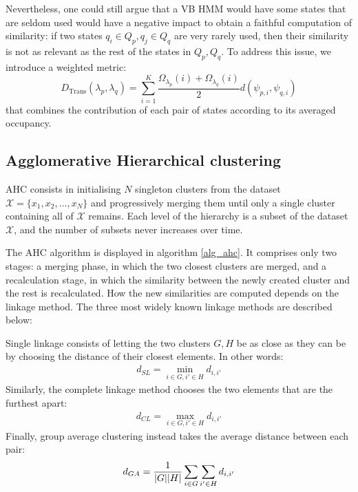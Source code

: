 \documentclass[pdftex,11pt,a4paper]{article}
\theoremstyle{definition}
\theoremstyle{remark}
\DeclarePairedDelimiter\abs{\lvert}{\rvert}%
\begin{document}
\par Nevertheless, one could still argue that a VB HMM would have some states that are seldom used would have a negative impact to obtain a faithful computation of similarity: if two states $q_i \in Q_p, q_j \in Q_q$ are very rarely used, then their similarity is not as relevant as the rest of the states in $Q_p, Q_q$. To address this issue, we introduce a weighted metric:
\begin{equation} \label{eq:hmmdist}
D_{\text{Trans}}(\lambda_p, \lambda_q) = \sum_{i=1}^K \frac{\Omega_{\lambda_p}(i) + \Omega_{\lambda_q}(i)}{2} d(\psi_{p, i}, \psi_{q, i})
\end{equation}
that combines the contribution of each pair of states according to its averaged occupancy.

\subsection{Agglomerative Hierarchical clustering}
AHC consists in initialising $N$ singleton clusters from the dataset $\mathcal{X} = \{x_1, x_2, ..., x_N\}$ and progressively merging them until only a single cluster containing all of $\mathcal{X}$ remains. Each level of the hierarchy is a subset of the dataset $\mathcal{X}$, and the number of subsets never increases over time.
\par The AHC algorithm is displayed in algorithm \ref{alg_ahc}. It comprises only two stages: a merging phase, in which the two closest clusters are merged, and a recalculation stage, in which the similarity between the newly created cluster and the rest is recalculated. How the new similarities are computed depends on the linkage method. The three most widely known linkage methods \cite{hastie2008} are described below:
\par Single linkage consists of letting the two clusters $G, H$ be as close as they can be by choosing the distance of their closest elements. In other words:
\begin{align*}
d_{SL} = \min_{i \in G, i' \in H} d_{i, i'}
\end{align*}
Similarly, the complete linkage method chooses the two elements that are the furthest apart:
\begin{align*}
d_{CL} = \max_{i \in G, i' \in H} d_{i, i'}
\end{align*}
Finally, group average clustering instead takes the average distance between each pair:
\begin{align*}
d_{GA} = \frac{1}{\abs{G}\abs{H}}\sum_{i\in G}\sum_{i'\in H}d_{i, i'}
\end{align*}
\end{document}
